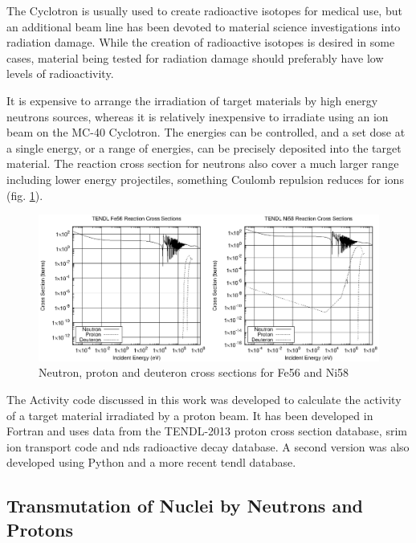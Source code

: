 The Cyclotron is usually used to create radioactive isotopes for medical use, but an additional beam line has been devoted to material science investigations into radiation damage.  While the creation of radioactive isotopes is desired in some cases, material being tested for radiation damage should preferably have low levels of radioactivity.

It is expensive to arrange the irradiation of target materials by high energy neutrons sources, whereas it is relatively inexpensive to irradiate using an ion beam on the MC-40 Cyclotron.  The energies can be controlled, and a set dose at a single energy, or a range of energies, can be precisely deposited into the target material.  The reaction cross section for neutrons also cover a much larger range including lower energy projectiles, something Coulomb repulsion reduces for ions (fig. \ref{fig:fe56ni58xs}).

\begin{figure}[tbp]
  \begin{center}
    \includegraphics[width=.7\linewidth]{chapters/background_activity/plots/npd_xs/fe56_ni58_xs.eps}
    \caption{Neutron, proton and deuteron cross sections for Fe56 and Ni58}
    \label{fig:fe56ni58xs}
  \end{center}
\end{figure}

The Activity code discussed in this work was developed to calculate the activity of a target material irradiated by a proton beam.  It has been developed in Fortran and uses data from the TENDL-2013 proton cross section database, \acrshort{srim} ion transport code and \acrlong{nds} radioactive decay database.  A second version was also developed using Python and a more recent \acrshort{tendl} database.


\FloatBarrier




\subsection{Transmutation of Nuclei by Neutrons and Protons}

